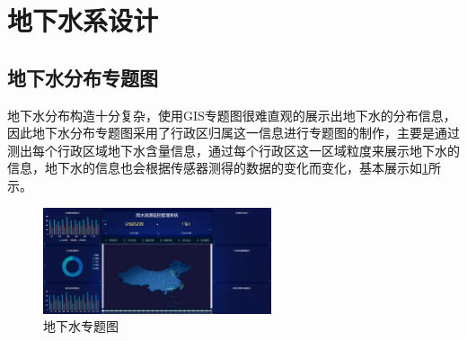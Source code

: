\section{地下水系设计}
\subsection{地下水分布专题图}
地下水分布构造十分复杂，使用GIS专题图很难直观的展示出地下水的分布信息，因此地下水分布专题图采用了行政区归属这一信息进行专题图的制作，主要是通过测出每个行政区域地下水含量信息，通过每个行政区这一区域粒度来展示地下水的信息，地下水的信息也会根据传感器测得的数据的变化而变化，基本展示如\ref{fig:dixiashui}所示。
\begin{figure}[!htb]%
	\centering
	\includegraphics[width=0.60\textwidth]{figs/dixiashui.png}
	\caption{地下水专题图}
	\label{fig:dixiashui}
\end{figure}
